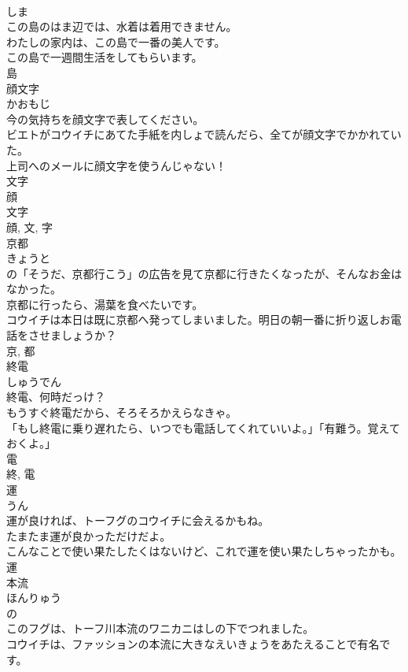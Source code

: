 \documentclass[8pt]{extreport}
\begin{document}
\begin{CJK}{UTF8}{min}
\\	しま	
\\	この島のはま辺では、水着は着用できません。	
\\	わたしの家内は、この島で一番の美人です。	
\\	この島で一週間生活をしてもらいます。	
\\	島	
\\	顔文字	
\\	かおもじ	
\\	今の気持ちを顔文字で表してください。	
\\	ビエトがコウイチにあてた手紙を内しょで読んだら、全てが顔文字でかかれていた。	
\\	上司へのメールに顔文字を使うんじゃない！	
\\	文字 
\\	顔 
\\	文字 
\\	顔, 文, 字	
\\	京都	
\\	きょうと	
\\	の「そうだ、京都行こう」の広告を見て京都に行きたくなったが、そんなお金はなかった。	
\\	京都に行ったら、湯葉を食べたいです。	
\\	コウイチは本日は既に京都へ発ってしまいました。明日の朝一番に折り返しお電話をさせましょうか？	
\\	京, 都	
\\	終電	
\\	しゅうでん	
\\	終電、何時だっけ？	
\\	もうすぐ終電だから、そろそろかえらなきゃ。	
\\	「もし終電に乗り遅れたら、いつでも電話してくれていいよ。」「有難う。覚えておくよ。」	
\\	電 
\\	終, 電	
\\	運	
\\	うん	
\\	運が良ければ、トーフグのコウイチに会えるかもね。	
\\	たまたま運が良かっただけだよ。	
\\	こんなことで使い果たしたくはないけど、これで運を使い果たしちゃったかも。	
\\	運	
\\	本流	
\\	ほんりゅう	
\\	の 
\\	このフグは、トーフ川本流のワニカニはしの下でつれました。	
\\	コウイチは、ファッションの本流に大きなえいきょうをあたえることで有名です。	

\end{CJK}
\end{document}
